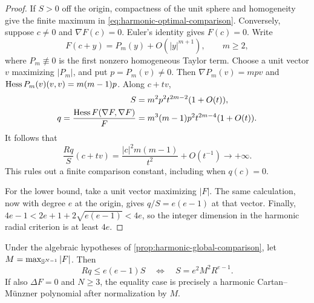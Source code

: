 \begin{proof}
If \(S>0\) off the origin, compactness of the unit sphere and
homogeneity give the finite maximum in
\eqref{eq:harmonic-optimal-comparison}.
Conversely, suppose \(c\ne0\) and \(\nabla F(c)=0\).
Euler's identity gives \(F(c)=0\). Write
\[
 F(c+y)=P_m(y)+O(|y|^{m+1}),\qquad m\ge2,
\]
where \(P_m\not\equiv0\) is the first nonzero homogeneous Taylor
term. Choose a unit vector \(v\) maximizing \(|P_m|\), and put
\(p=P_m(v)\ne0\). Then
\(\nabla P_m(v)=mpv\) and
\(\operatorname{Hess} P_m(v)(v,v)=m(m-1)p\). Along \(c+tv\),
\begin{align*}
 S&=m^2p^2t^{2m-2}(1+O(t)),\\
 q=\frac{\operatorname{Hess} F(\nabla F,\nabla F)}{F}
  &=m^3(m-1)p^2t^{2m-4}(1+O(t)).
\end{align*}
It follows that
\begin{equation}\label{eq:critical-comparison-blowup}
 \frac{Rq}{S}(c+tv)
 =\frac{|c|^2m(m-1)}{t^2}+O(t^{-1})\longrightarrow+\infty.
\end{equation}
This rules out a finite comparison constant, including when
\(q(c)=0\).

For the lower bound, take a unit vector maximizing \(|F|\).
The same calculation, now with degree \(e\) at the origin, gives
\(q/S=e(e-1)\) at that vector. Finally, \(4e-1<2e+1+2\sqrt{e(e-1)}<4e\),
so the integer dimension in the harmonic radial criterion is at least \(4e\).
\end{proof}

\begin{proposition}
\label{prop:harmonic-sharp-comparison}
Under the algebraic hypotheses of
\cref{prop:harmonic-global-comparison}, let
\(M=\max_{\mathbb S^{N-1}}|F|\). Then
\begin{equation}\label{eq:harmonic-comparison-rigidity}
 Rq\le e(e-1)S
 \quad\Longleftrightarrow\quad
 S=e^2M^2R^{e-1}.
\end{equation}
If also \(\Delta F=0\) and \(N\ge3\), the equality case is
precisely a harmonic Cartan--M\"unzner polynomial after normalization
by \(M\).
\end{proposition}

